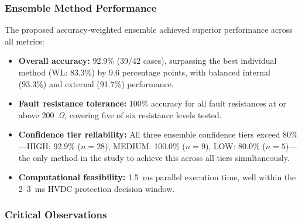 \documentclass[journal]{IEEEtran}
\begin{document}
\subsubsection{Ensemble Method Performance}

The proposed accuracy-weighted ensemble achieved superior performance
across all metrics:

\begin{itemize}
    \item \textbf{Overall accuracy:} 92.9\% (39/42 cases), surpassing
    the best individual method (WL: 83.3\%) by 9.6 percentage points,
    with balanced internal (93.3\%) and external (91.7\%) performance.

    \item \textbf{Fault resistance tolerance:} 100\% accuracy for all
    fault resistances at or above 200~$\Omega$, covering five of six
    resistance levels tested.

    \item \textbf{Confidence tier reliability:} All three ensemble
    confidence tiers exceed 80\%---HIGH: 92.9\% ($n=28$), MEDIUM:
    100.0\% ($n=9$), LOW: 80.0\% ($n=5$)---the only method in the
    study to achieve this across all tiers simultaneously.

    \item \textbf{Computational feasibility:} 1.5~ms parallel execution
    time, well within the 2--3~ms HVDC protection decision window.
\end{itemize}

\subsubsection{Critical Observations}
\end{document}
